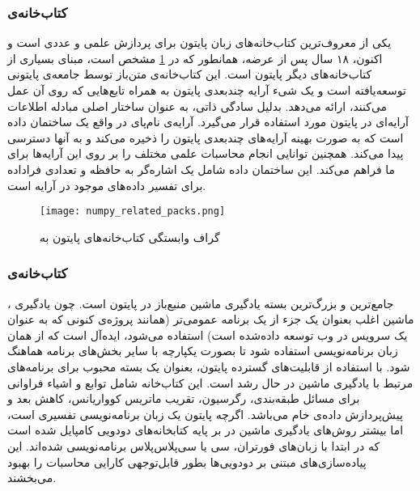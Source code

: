 \subsubsection{کتاب‌خانه‌ی }
 یکی از معروف‌ترین کتاب‌خانه‌های زبان پایتون برای پردازش علمی و عددی است و اکنون، ۱۸ سال پس از عرضه، همانطور که در \cref{fig:numpy_related_packs}\cite{van2011numpy} مشخص است، مبنای بسیاری از کتاب‌خانه‌های دیگر پایتون است. این کتاب‌خانه‌ی متن‌باز توسط جامعه‌ی پایتونی توسعه‌یافته است و یک شیء آرایه چندبعدی پایتون به همراه تابع‌هایی که روی آن عمل می‌کنند، ارائه می‌دهد.  بدلیل سادگی ذاتی، به عنوان ساختار اصلی مبادله اطلاعات آرایه‌ای در پایتون مورد استفاده قرار می‌گیرد\cite{harris2020array}. آرایه‌ی نام‌پای در واقع یک ساختمان داده است که به صورت بهینه آرایه‌های چند‌بعدی پایتون را ذخیره می‌کند و به آنها دسترسی پیدا می‌کند. همچنین توانایی انجام محاسبات علمی مختلف را بر روی این آرایه‌ها برای ما فراهم می‌کند. این ساختمان داده شامل یک اشاره‌گر به حافظه و تعدادی فراداده برای تفسیر داده‌های موجود در آرایه است\cite{harris2020array, van2011numpy}.

\begin{figure}[!h]
\centerline{\texttt{[image: numpy\_related\_packs.png]}}
\caption{گراف وابستگی کتاب‌خانه‌های پایتون به \cite{van2011numpy}}
\label{fig:numpy_related_packs}
\end{figure}

\subsubsection{کتاب‌خانه‌ی } 
، جامع‌ترین و بزرگ‌ترین بسته یادگیری ماشین منبع‌باز در پایتون است. چون یادگیری ماشین اغلب بعنوان یک جزء از یک برنامه عمومی‌تر (همانند پروژه‌ی کنونی که به عنوان یک سرویس در وب توسعه داده‌شده است) استفاده می‌شود، ایده‌آل است که از همان زبان برنامه‌نویسی استفاده شود تا بصورت یکپارچه با سایر بخش‌های برنامه هماهنگ شود. با استفاده از قابلیت‌های گسترده پایتون،  بعنوان یک بسته محبوب برای برنامه‌های مرتبط با یادگیری ماشین در حال رشد است\cite{hao2019machine}. این کتاب‌خانه شامل توابع و اشیاء فراوانی برای مسائل طبقه‌بندی، رگرسیون، تقریب ماتریس کوواریانس، کاهش بعد و پیش‌پردازش داده‌ی خام می‌باشد\cite{kramer2016scikit}. اگرچه پایتون یک زبان برنامه‌نویسی تفسیری است، اما بیشتر روش‌های یادگیری ماشین در  بر پایه کتابخانه‌های دودویی کامپایل شده است که در ابتدا با زبان‌های فورتران، سی یا سی‌پلاس‌پلاس برنامه‌نویسی شده‌اند. این پیاده‌سازی‌های مبتنی بر دودویی‌ها بطور قابل‌توجهی کارایی محاسبات را بهبود می‌بخشند\cite{hao2019machine, kramer2016scikit}.

